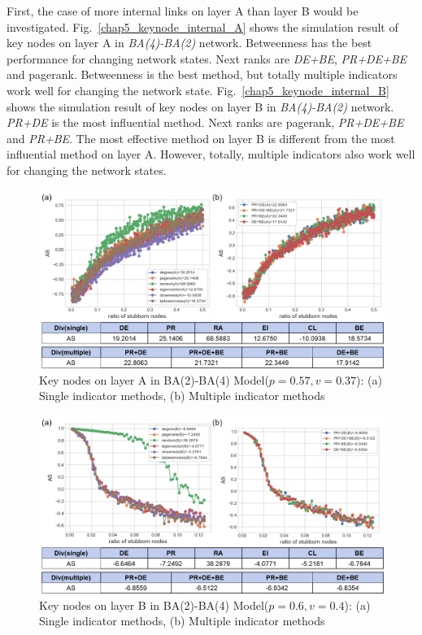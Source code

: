 First, the case of more internal links on layer A than layer B would be investigated. 
Fig.~\ref{chap5_keynode_internal_A} shows the simulation result of key nodes on layer A in \textit{BA(4)-BA(2)} network. Betweenness has the best performance for changing network states. Next ranks are \textit{DE+BE}, \textit{PR+DE+BE} and pagerank. Betweenness is the best method, but totally multiple indicators work well for changing the network state.  
Fig.~\ref{chap5_keynode_internal_B} shows the simulation result of key nodes on layer B in \textit{BA(4)-BA(2)} network. \textit{PR+DE} is the most influential method. Next ranks are pagerank, \textit{PR+DE+BE} and \textit{PR+BE}. The most effective method on layer B is different from the most influential method on layer A. However, totally, multiple indicators also work well for changing the network states.  
\begin{figure}[!htb]
	\centering
	\includegraphics[width=\hsize]{figure/chap5_keynode_internal_A2.png}
	\caption{Key nodes on layer A in BA(2)-BA(4) Model($p=0.57, v=0.37$):
		(a) Single indicator methods, (b) Multiple indicator methods}
	\label{chap5_keynode_internal_A2}
\end{figure}
\begin{figure}[!htb]
	\centering
	\includegraphics[width=\hsize]{figure/chap5_keynode_internal_B2.png}
	\caption{Key nodes on layer B in BA(2)-BA(4) Model($p=0.6, v=0.4$):
		(a) Single indicator methods, (b) Multiple indicator methods}
	\label{chap5_keynode_internal_B2}
\end{figure}
